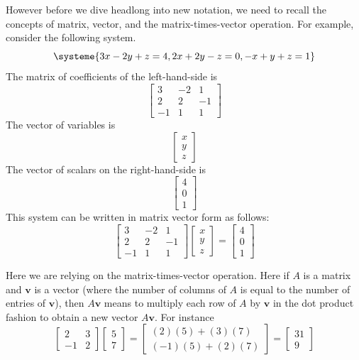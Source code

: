 \documentclass[11pt,oneside]{amsbook}
\theoremstyle{definition}
\theoremstyle{plain}
\theoremstyle{definition}
\theoremstyle{remark}
\numberwithin{equation}{section}
\numberwithin{figure}{section}
\begin{document}
However before we dive headlong into new notation, we need to recall the concepts of matrix, vector, and the matrix-times-vector operation. For example, consider the following system.
\[\systeme{3x-2y+z=4,2x+2y-z=0,-x+y+z=1}
\]
The matrix of coefficients of the left-hand-side is
\[\begin{bmatrix}3&-2&1\\2&2&-1\\-1&1&1\end{bmatrix}
\]
The vector of variables is
\[\begin{bmatrix}x\\y\\z\end{bmatrix}
\]
The vector of scalars on the right-hand-side is
\[\begin{bmatrix}4\\0\\1\end{bmatrix}
\]
This system can be written in matrix vector form as follows:
\[\begin{bmatrix}3&-2&1\\2&2&-1\\-1&1&1\end{bmatrix}
  \begin{bmatrix}x\\y\\z\end{bmatrix}
  =\begin{bmatrix}4\\0\\1\end{bmatrix}
\]

Here we are relying on the matrix-times-vector operation. Here if $A$ is a matrix and $\mathbf{v}$ is a vector (where the number of columns of $A$ is equal to the number of entries of $\mathbf{v}$), then $A\mathbf{v}$ means to multiply each row of $A$ by  $\mathbf{v}$ in the dot product fashion to obtain a new vector $A\mathbf{v}$. For instance
\[\begin{bmatrix}2&3\\-1&2\end{bmatrix}
  \begin{bmatrix}5\\7\end{bmatrix}
  =\begin{bmatrix}(2)(5)+(3)(7)\\(-1)(5)+(2)(7)\end{bmatrix}
  =\begin{bmatrix}31\\9\end{bmatrix}
\]
\end{document}

